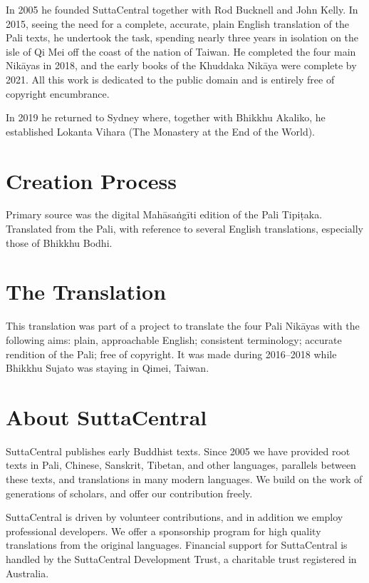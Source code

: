 \documentclass[12pt,openany]{book}%
\begin{document}
In 2005 he founded SuttaCentral together with Rod Bucknell and John Kelly. In 2015, seeing the need for a complete, accurate, plain English translation of the Pali texts, he undertook the task, spending nearly three years in isolation on the isle of Qi Mei off the coast of the nation of Taiwan. He completed the four main \textsanskrit{Nikāyas} in 2018, and the early books of the Khuddaka \textsanskrit{Nikāya} were complete by 2021. All this work is dedicated to the public domain and is entirely free of copyright encumbrance. 

In 2019 he returned to Sydney where, together with Bhikkhu Akaliko, he established Lokanta Vihara (The Monastery at the End of the World). 

\section*{Creation Process}

Primary source was the digital \textsanskrit{Mahāsaṅgīti} edition of the Pali \textsanskrit{Tipiṭaka}. Translated from the Pali, with reference to several English translations, especially those of Bhikkhu Bodhi.

\section*{The Translation}

This translation was part of a project to translate the four Pali \textsanskrit{Nikāyas} with the following aims: plain, approachable English; consistent terminology; accurate rendition of the Pali; free of copyright. It was made during 2016–2018 while Bhikkhu Sujato was staying in Qimei, Taiwan.

\section*{About SuttaCentral}

SuttaCentral publishes early Buddhist texts. Since 2005 we have provided root texts in Pali, Chinese, Sanskrit, Tibetan, and other languages, parallels between these texts, and translations in many modern languages. We build on the work of generations of scholars, and offer our contribution freely.

SuttaCentral is driven by volunteer contributions, and in addition we employ professional developers. We offer a sponsorship program for high quality translations from the original languages. Financial support for SuttaCentral is handled by the SuttaCentral Development Trust, a charitable trust registered in Australia.
\end{document}
